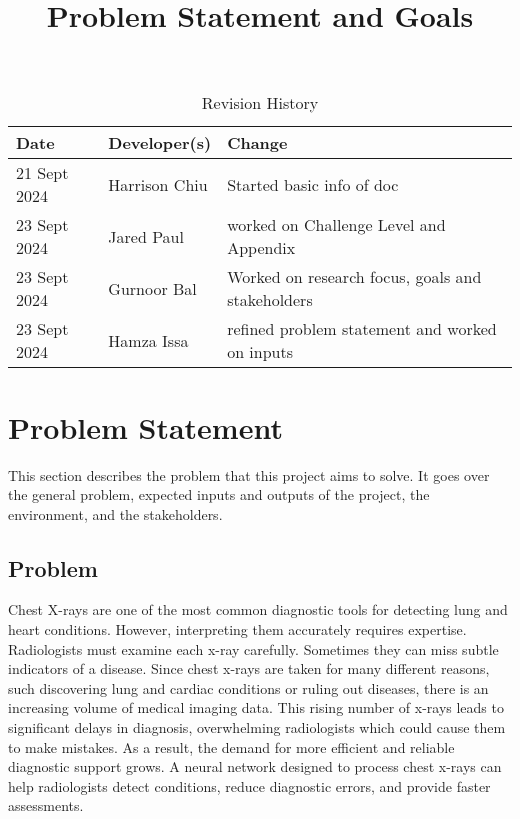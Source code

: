 \documentclass{article}
\title{Problem Statement and Goals\\\progname}
\author{\authname}
\date{}
\begin{document}
\maketitle

\begin{table}[hp]
\caption{Revision History} \label{TblRevisionHistory}
\begin{tabularx}{\textwidth}{llX}
\toprule
\textbf{Date} & \textbf{Developer(s)} & \textbf{Change}\\
\midrule
21 Sept 2024 & Harrison Chiu & Started basic info of doc \\
23 Sept 2024 & Jared Paul & worked on Challenge Level and Appendix\\
23 Sept 2024 & Gurnoor Bal & Worked on research focus, goals and stakeholders\\
23 Sept 2024 & Hamza Issa & refined problem statement and worked on inputs\\
\bottomrule
\end{tabularx}
\end{table}

\section{Problem Statement}

This section describes the problem that this project aims to solve. It goes over the general
problem, expected inputs and outputs of the project, the environment, and the stakeholders.


\subsection{Problem}

Chest X-rays are one of the most common diagnostic tools for detecting lung and heart conditions.
However, interpreting them accurately requires expertise. Radiologists must examine each x-ray 
carefully. Sometimes they can miss subtle indicators of a disease. Since chest x-rays are taken
for many different reasons, such discovering lung and cardiac conditions or ruling out diseases, 
there is an increasing volume of medical imaging data. This rising number of x-rays leads to
significant delays in diagnosis, overwhelming radiologists which could cause them to make 
mistakes. As a result, the demand for more efficient and reliable diagnostic support grows. A 
neural network designed to process chest x-rays can help radiologists detect conditions, reduce 
diagnostic errors, and provide faster assessments.
\end{document}
